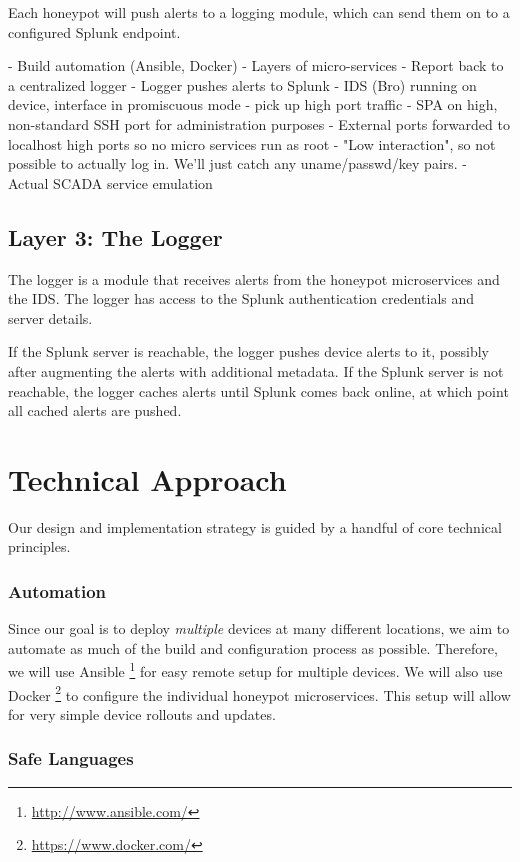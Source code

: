 Each honeypot will push alerts to a logging module, which
can send them on to a configured Splunk endpoint.

- Build automation (Ansible, Docker)
- Layers of micro-services
- Report back to a centralized logger
- Logger pushes alerts to Splunk
- IDS (Bro) running on device, interface in promiscuous mode
    - pick up high port traffic
- SPA on high, non-standard SSH port for administration purposes
- External ports forwarded to localhost high ports so no micro services
  run as root
- "Low interaction", so not possible to actually log in. We'll just catch
  any uname/passwd/key pairs.
- Actual SCADA service emulation

\subsection{Layer 3: The Logger}

The logger is a module that receives alerts from the honeypot microservices
and the IDS. The logger has access to the Splunk authentication credentials
and server details.

If the Splunk server is reachable, the logger pushes device alerts to it,
possibly after augmenting the alerts with additional metadata. If the Splunk
server is not reachable, the logger caches alerts until Splunk comes back
online, at which point all cached alerts are pushed.

\section{Technical Approach}

Our design and implementation strategy is guided by a handful of core
technical principles.

\subsubsection{Automation}

Since our goal is to deploy \textit{multiple} devices at many different
locations, we aim to automate as much of the build and configuration process
as possible. Therefore, we will use Ansible
\footnote{\url{http://www.ansible.com/}} for easy remote setup for
multiple devices. We will also use Docker
\footnote{\url{https://www.docker.com/}} to configure the individual
honeypot microservices. This setup will allow for very simple device rollouts
and updates.

\subsubsection{Safe Languages}

